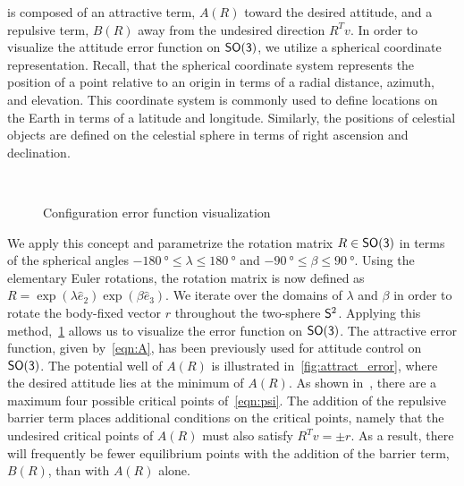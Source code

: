 \documentclass[fleqn]{IJCAS}  %
\begin{document}
\begin{multicols}{2}
 is composed of an attractive term, \( A (R) \) toward the desired attitude, and a repulsive term, \( B(R) \) away from the undesired direction \( R^T v \).
In order to visualize the attitude error function on \( \SO \), we utilize a spherical coordinate representation.
Recall, that the spherical coordinate system represents the position of a point relative to an origin in terms of a radial distance, azimuth, and elevation.
This coordinate system is commonly used to define locations on the Earth in terms of a latitude and longitude.
Similarly, the positions of celestial objects are defined on the celestial sphere in terms of right ascension and declination. 
\begin{figure}[H]%
    \centering 
    ~
    \\%
    \caption{Configuration error function visualization}
    \label{fig:config_error} 
\end{figure}%
We apply this concept and parametrize the rotation matrix \( R \in \SO \) in terms of the spherical angles \( \SI{-180}{\degree} \leq \lambda \leq \SI{180}{\degree}  \) and \( \SI{-90}{\degree} \leq \beta \leq \SI{90}{\degree} \). 
Using the elementary Euler rotations, the rotation matrix is now defined as \( R = \exp( \lambda \hat{e}_2) \exp( \beta \hat{e}_3) \).
We iterate over the domains of \( \lambda\) and \(\beta\) in order to rotate the body-fixed vector \( r \) throughout the two-sphere \( \S^2 \).
Applying this method,~\cref{fig:config_error} allows us to visualize the error function on \( \SO \).
The attractive error function, given by~\cref{eqn:A}, has been previously used for attitude control on \(\SO\).
The potential well of \( A(R)\) is illustrated in~\cref{fig:attract_error}, where the desired attitude lies at the minimum of \( A(R) \).
As shown in~, there are a maximum four possible critical points of~\cref{eqn:psi}.
The addition of the repulsive barrier term places additional conditions on the critical points, namely that the undesired critical points of \( A(R) \) must also satisfy \( R^T v = \pm r \).
As a result, there will frequently be fewer equilibrium points with the addition of the barrier term, \( B(R) \), than with \( A(R) \) alone.


\end{multicols}
\end{document}
